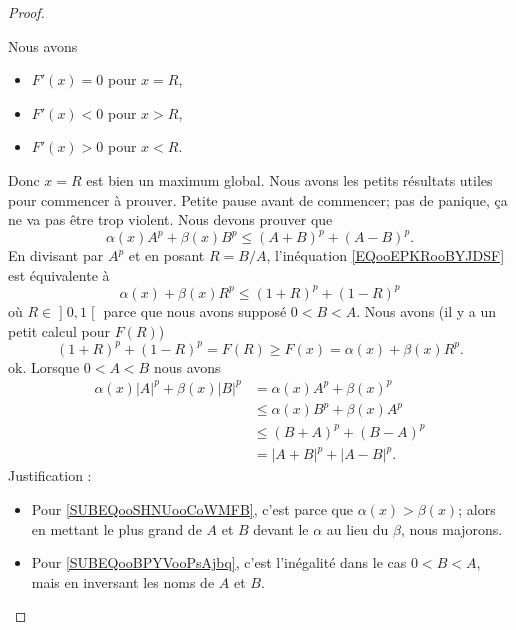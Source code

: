 \begin{proof}
\begin{subproof}
\begin{equation}
			\end{equation}
			Nous avons
			\begin{itemize}
				\item \( F'(x)=0\) pour \( x=R\),
				\item \( F'(x)<0\) pour \( x>R\),
				\item \( F'(x)>0\) pour \( x<R\).
			\end{itemize}
			Donc \( x=R\) est bien un maximum global.
			\spitem[Pause]
			Nous avons les petits résultats utiles pour commencer à prouver. Petite pause avant de commencer; pas de panique, ça ne va pas être trop violent.
			\spitem[Pour \( 0<B<A\)]
			Nous devons prouver que
			\begin{equation}        \label{EQooEPKRooBYJDSF}
				\alpha(x)A^p+\beta(x)B^p\leq (A+B)^p+(A-B)^p.
			\end{equation}
			En divisant par \( A^p\) et en posant \( R=B/A\), l'inéquation \eqref{EQooEPKRooBYJDSF} est équivalente à
			\begin{equation}
				\alpha(x)+\beta(x)R^p\leq (1+R)^p+(1-R)^p
			\end{equation}
			où \( R\in \mathopen] 0 , 1 \mathclose[\) parce que nous avons supposé \( 0<B<A\). Nous avons (il y a un petit calcul pour \( F(R)\))
			\begin{equation}
				(1+R)^p+(1-R)^p=F(R)\geq F(x)=\alpha(x)+\beta(x)R^p.
			\end{equation}
			ok.
			\spitem[Pour \( 0<A<B\)]
			Lorsque \( 0<A<B\) nous avons
			\begin{subequations}
				\begin{align}
					\alpha(x)| A |^p+\beta(x)| B |^p & =\alpha(x)A^p+\beta(x)^p                                       \\
					                                 & \leq \alpha(x)B^p+\beta(x)A^p      \label{SUBEQooSHNUooCoWMFB} \\
					                                 & \leq (B+A)^p+(B-A)^p       \label{SUBEQooBPYVooPsAjbq}         \\
					                                 & =| A+B |^p+| A-B |^p.
				\end{align}
			\end{subequations}
			Justification :
			\begin{itemize}
				\item Pour \eqref{SUBEQooSHNUooCoWMFB}, c'est parce que \( \alpha(x)>\beta(x)\); alors en mettant le plus grand de \( A\) et \( B\) devant le \( \alpha\) au lieu du \( \beta\), nous majorons.
				\item Pour \eqref{SUBEQooBPYVooPsAjbq}, c'est l'inégalité dans le cas \( 0<B<A\), mais en inversant les noms de \( A\) et \( B\).

\end{itemize}
\end{subproof}
\end{proof}
